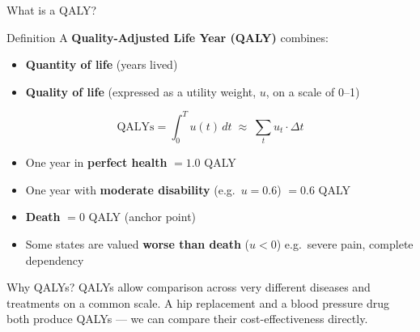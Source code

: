 \documentclass[aspectratio=169, 12pt]{beamer}
\begin{document}
\begin{frame}{What is a QALY?}
  \begin{block}{Definition}
    A \textbf{Quality-Adjusted Life Year (QALY)} combines:
    \begin{itemize}
      \item \textbf{Quantity of life} (years lived)
      \item \textbf{Quality of life} (expressed as a utility weight, $u$, on a scale of 0--1)
    \end{itemize}
    $$\text{QALYs} = \int_0^T u(t)\, dt \;\approx\; \sum_t u_t \cdot \Delta t$$
  \end{block}
  \vspace{0.3em}
  \begin{itemize}
    \item One year in \textbf{perfect health} $= 1.0$ QALY
    \item One year with \textbf{moderate disability} (e.g.\ $u = 0.6$) $= 0.6$ QALY
    \item \textbf{Death} $= 0$ QALY (anchor point)
    \item Some states are valued \textbf{worse than death} ($u < 0$) e.g.\ severe pain,
          complete dependency
  \end{itemize}
  \begin{alertblock}{Why QALYs?}
    QALYs allow comparison across very different diseases and treatments on a common scale.
    A hip replacement and a blood pressure drug both produce QALYs --- we can compare their
    cost-effectiveness directly.
  \end{alertblock}
\end{frame}
\end{document}
